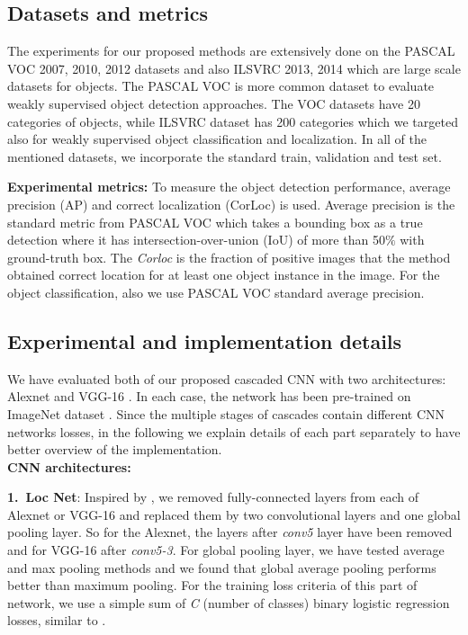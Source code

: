 \documentclass[10pt,twocolumn,letterpaper]{article}
\begin{document}
\subsection{Datasets and metrics}
The experiments for our proposed methods are extensively done on the PASCAL VOC 2007, 2010, 2012 datasets and also ILSVRC 2013, 2014 which are large scale datasets for objects. The PASCAL VOC is more common dataset to evaluate weakly supervised object detection approaches. The VOC datasets have 20 categories of objects, while ILSVRC dataset has 200 categories which we targeted also for weakly supervised object classification and localization. In all of the mentioned datasets, we incorporate the standard train, validation and test set.

\textbf{Experimental metrics:} To measure the object detection performance, average precision (AP) and correct localization (CorLoc) is used. Average precision is the standard metric from PASCAL VOC which takes a bounding box as a true detection where it has intersection-over-union (IoU) of more than 50$\%$ with ground-truth box. The \textit{Corloc} is the fraction of positive images that the method obtained correct location for at least one object instance in the image. For the object classification, also we use PASCAL VOC standard average precision.

\subsection{Experimental and implementation details }
We have evaluated both of our proposed cascaded CNN with two architectures: Alexnet \cite{alexnet} and VGG-16 \cite{vgg}. In each case, the network has been pre-trained on ImageNet dataset \cite{imagenet}. Since the multiple stages of cascades contain different CNN networks losses, in the following we explain details of each part separately to have better overview of the implementation.
\\
\textbf{CNN architectures:}

\textbf{1.~Loc Net}: Inspired by \cite{gap_paper}, we removed fully-connected layers from each of Alexnet or VGG-16 and replaced them by two convolutional layers and one global pooling layer. So for the Alexnet, the layers after \textit{conv5} layer have been removed and for VGG-16 after \textit{conv5-3}. For global pooling layer, we have tested average and max pooling methods and we found that global average pooling performs better than maximum pooling. For the training loss criteria of this part of network, we use a simple sum of \textit{C} (number of classes) binary logistic regression losses, similar to \cite{laptev15}.
\end{document}
